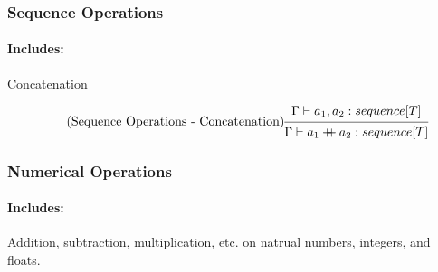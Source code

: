 \documentclass{article}
\newcommand{\concat}{%
  \mathbin{{+}\mspace{-8mu}{+}}%
}
\begin{document}
\subsubsection{Sequence Operations}
\paragraph{Includes:} Concatenation

\begin{gather}
\tag{Sequence Operations - Concatenation}
\begin{prooftree}
\hypo{\Gamma \vdash a_1, a_2: sequence[T]}
\infer1{\Gamma \vdash a_1 \concat a_2: sequence[T]}
\end{prooftree}
\end{gather}

\subsubsection{Numerical Operations}
\paragraph{Includes:} Addition, subtraction, multiplication, etc. on natrual numbers, integers, and floats.
\end{document}
